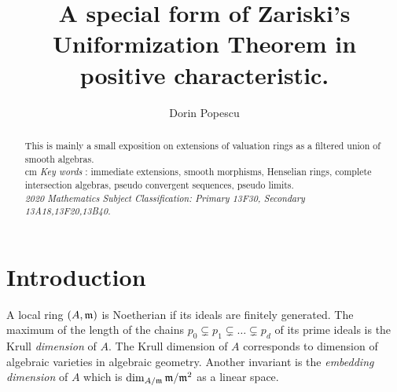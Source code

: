 \documentclass[12pt]{amsart}
\def\frk{\frak}               %
\def\mm{{\frk m}}
\theoremstyle{definition}
\theoremstyle{subsection-tweak}
\theoremstyle{theorem}
\theoremstyle{definition}
\begin{document}
\title{A special form of Zariski's Uniformization Theorem in positive characteristic.}

\author{ Dorin Popescu}

\address{Simion Stoilow Institute of Mathematics of the Romanian Academy,
Research unit 5, P.O. Box 1-764, Bucharest 014700, Romania,}

\address{University of Bucharest, Faculty of Mathematics and Computer Science
Str. Academiei 14, Bucharest 1, RO-010014, Romania,}

\address{ Email: {\sf dorin.m.popescu@gmail.com}}



\begin{abstract} This is mainly a small exposition on extensions of valuation rings
as a filtered union of smooth algebras. \\
 cm
{\it Key words }: immediate extensions, smooth morphisms, Henselian rings, complete intersection algebras, pseudo convergent sequences, pseudo limits.   \\
 {\it 2020 Mathematics Subject Classification: Primary 13F30, Secondary 13A18,13F20,13B40.}
\end{abstract}

\maketitle
\section{Introduction}

A local ring   $(A,\mm)$ is  Noetherian if its  ideals are finitely generated. The maximum of the length of the chains
$p_0
\subsetneq p_1\subsetneq\ldots \subsetneq p_d$
 of its prime ideals is the Krull {\em dimension} of $A$. The Krull dimension of $A$ corresponds to dimension of algebraic varieties in algebraic geometry.
Another invariant is the  {\em embedding dimension} of $A$ which is 
 $\dim_{A/\mm} \mm/\mm^2$  as a linear space.
\end{document}
